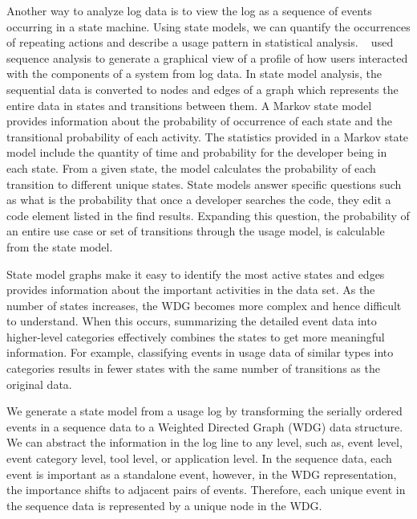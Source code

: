 Another way to analyze log data is to view the log as a sequence of events occurring in a state machine.  Using state models, we can quantify the occurrences of repeating actions and describe a usage pattern in statistical analysis.  ~ used sequence analysis to generate a graphical view of a profile of how users interacted with the components of a system from log data.  In state model analysis, the sequential data is converted to nodes and edges of a graph which represents the entire data in states and transitions between them.  A Markov state model provides information about the probability of occurrence of each state and the transitional probability of each activity.   The statistics provided in a Markov state model include the quantity of time and probability for the developer being in each state.  From a given state, the model calculates the probability of each transition to different unique states.  State models answer specific questions such as what is the probability that once a developer searches the code, they edit a code element listed in the find results. Expanding this question, the probability of an entire use case or set of transitions through the usage model, is calculable from the state model.  

State model graphs make it easy to identify the most active states and edges provides information about the important activities in the data set.  As the number of states increases, the WDG becomes more complex and hence difficult to understand.  When this occurs, summarizing the detailed event data into higher-level categories effectively combines the states to get more meaningful information.   For example, classifying events in usage data of similar types into categories results in fewer states with the same number of transitions as the original data.

We generate a state model from a usage log by transforming the serially ordered events in a sequence data to a Weighted Directed Graph (WDG) data structure.  We can abstract the information in the log line to any level, such as, event level, event category level, tool level, or application level. In the sequence data, each event is important as a standalone event, however, in the WDG representation, the importance shifts to adjacent pairs of events. 
Therefore, each unique event in the sequence data is represented by a unique node in the WDG. 

